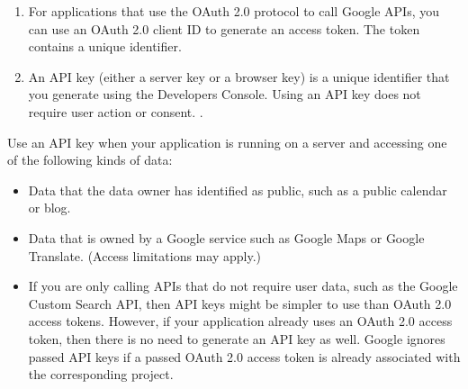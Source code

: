 \begin{enumerate}
\item
{}

For applications that use the OAuth 2.0 protocol to call Google APIs,
you can use an OAuth 2.0 client ID to generate an access token. The
token contains a unique identifier.

\item
{}

An API key (either a server key or a browser key) is a unique identifier
that you generate using the Developers Console. Using an API key does
not require user action or consent. .
\end{enumerate}

Use an API key when your application is running on a server and accessing
one of the following kinds of data:

\begin{itemize}
\item
Data that the data owner has identified as public, such as a public
calendar or blog.
\item
Data that is owned by a Google service such as Google Maps or Google
Translate. (Access limitations may apply.)
\item
If you are only calling APIs that do not require user data, such as the
Google Custom Search API, then API keys might be simpler to use than
OAuth 2.0 access tokens. However, if your application already uses an
OAuth 2.0 access token, then there is no need to generate an API key as
well. Google ignores passed API keys if a passed OAuth 2.0 access token
is already associated with the corresponding project.
\end{itemize}

